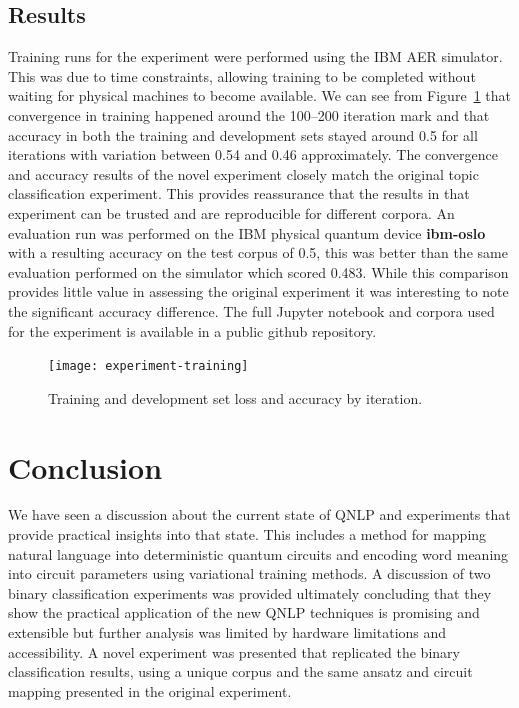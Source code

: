 \documentclass[a4paper,twocolumn,11pt]{quantumarticle}
\begin{document}
    \subsection{Results}\label{subsec:novel-results}
    Training runs for the experiment were performed using the IBM AER simulator.
    This was due to time constraints, allowing training to be completed without waiting for physical machines to become
    available.
    \newline
    We can see from Figure~\ref{fig:experiment-training} that convergence in training happened around the 100--200 iteration
    mark and that accuracy in both the training and development sets stayed around 0.5 for all iterations with variation
    between 0.54 and 0.46 approximately.
    The convergence and accuracy results of the novel experiment closely match the original topic classification
    experiment\cite{qnlp_in_prac}.
    This provides reassurance that the results in that experiment can be trusted and are reproducible for different
    corpora.
    \newline
    An evaluation run was performed on the IBM physical quantum device \textbf{ibm-oslo} with a resulting accuracy
    on the test corpus of 0.5, this was better than the same evaluation performed on the simulator which scored 0.483.
    While this comparison provides little value in assessing the original experiment it was interesting to note the
    significant accuracy difference.
    The full Jupyter notebook and corpora used for the experiment is available in a public github repository\cite{novel-exp-repo}.
    \begin{figure}[h]
        \centering
        \texttt{[image: experiment-training]}
        \caption{Training and development set loss and accuracy by iteration\cite{novel-exp-repo}.}
        \label{fig:experiment-training}
    \end{figure}
    \section{Conclusion}\label{sec:conclusion}
    We have seen a discussion about the current state of QNLP and experiments that provide practical insights into that
    state.
    This includes a method for mapping natural language into deterministic quantum circuits and encoding word meaning
    into circuit parameters using variational training methods.
    A discussion of two binary classification experiments was provided ultimately concluding that they show the
    practical application of the new QNLP techniques is promising and extensible but further analysis was limited
    by hardware limitations and accessibility.
    A novel experiment was presented that replicated the binary classification results, using a unique corpus and the same
    ansatz and circuit mapping presented in the original experiment.
    
    
\end{document}
